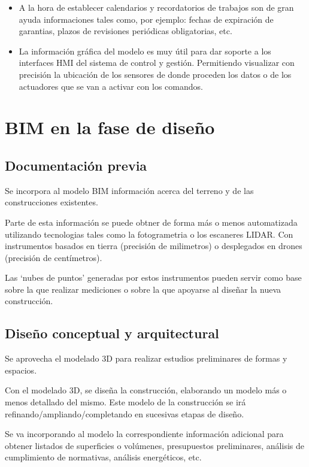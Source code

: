 \documentclass[spanish,12pt,a4paper,final,oneside]{book}
\begin{document}
\begin{enumerate}
\begin{itemize}
\item A la hora de establecer calendarios y recordatorios de trabajos son de gran ayuda informaciones tales como, por ejemplo: fechas de expiración de garantias, plazos de revisiones periódicas obligatorias, etc. 

\item La información gráfica del modelo es muy útil para dar soporte a los interfaces HMI del sistema de control y gestión. Permitiendo visualizar con precisión la ubicación de los sensores de donde proceden los datos o de los actuadores que se van a activar con los comandos.


\end{itemize}

\end{enumerate}

\chapter{BIM en la fase de diseño}

\section{Documentación previa}
Se incorpora al modelo BIM información acerca del terreno y de las construcciones existentes. 

Parte de esta información se puede obtner de forma más o menos automatizada utilizando tecnologias tales como la fotogrametria o los escaneres LIDAR. Con instrumentos basados en tierra (precisión de milimetros) o desplegados en drones (precisión de centímetros).

Las ‘nubes de puntos’ generadas por estos instrumentos pueden servir como base sobre la que realizar mediciones o sobre la que apoyarse al diseñar la nueva construcción.

\section{Diseño conceptual y arquitectural}
Se aprovecha el modelado 3D para realizar estudios preliminares de formas y espacios.

Con el modelado 3D, se diseña la construcción, elaborando un modelo más o menos detallado del mismo. Este modelo de la construcción se irá refinando/ampliando/completando en sucesivas etapas de diseño.

Se va incorporando al modelo la correspondiente información adicional para obtener listados de superficies o volúmenes, presupuestos preliminares, análisis de cumplimiento de normativas, análisis energéticos, etc.
\end{document}
